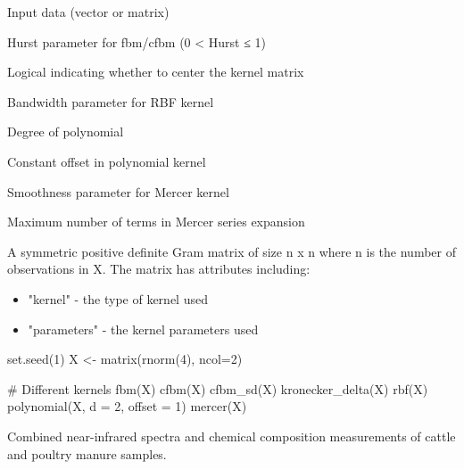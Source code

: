 \documentclass[a4paper]{book}
\begin{document}
%
\begin{Arguments}
\begin{ldescription}
\item[\code{X}] Input data (vector or matrix)

\item[\code{Hurst}] Hurst parameter for fbm/cfbm (0 < Hurst ≤ 1)

\item[\code{center}] Logical indicating whether to center the kernel matrix

\item[\code{lengthscale}] Bandwidth parameter for RBF kernel

\item[\code{d}] Degree of polynomial

\item[\code{offset}] Constant offset in polynomial kernel

\item[\code{delta}] Smoothness parameter for Mercer kernel

\item[\code{max\_terms}] Maximum number of terms in Mercer series expansion
\end{ldescription}
\end{Arguments}
%
\begin{Value}
A symmetric positive definite Gram matrix of size n x n where n is the
number of observations in X. The matrix has attributes including:
\begin{itemize}

\item{} "kernel" - the type of kernel used
\item{} "parameters" - the kernel parameters used

\end{itemize}

\end{Value}
%
\begin{Examples}
\begin{ExampleCode}
set.seed(1)
X <- matrix(rnorm(4), ncol=2)

# Different kernels
fbm(X)
cfbm(X)
cfbm_sd(X)
kronecker_delta(X)
rbf(X)
polynomial(X, d = 2, offset = 1)
mercer(X)
\end{ExampleCode}
\end{Examples}
%
\begin{Description}
Combined near-infrared spectra and chemical composition measurements of cattle and poultry manure samples.
\end{Description}
\end{document}
